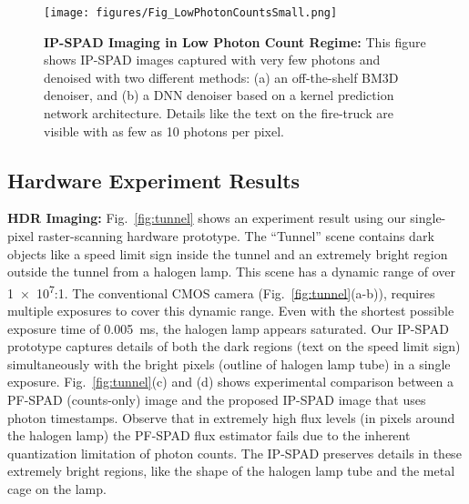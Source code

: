 
\begin{figure}[!htb]
  \centering
  \texttt{[image: figures/Fig\_LowPhotonCountsSmall.png]}
	\caption{\textbf{IP-SPAD Imaging in Low Photon Count Regime:}
  This figure shows IP-SPAD images captured with very few photons and denoised
  with two different methods: (a) an off-the-shelf BM3D denoiser, and (b) a DNN
  denoiser based on a kernel prediction network architecture.
  Details like the text on the fire-truck are visible with as few as 10 photons per
  pixel.\label{fig:low_counts}}
  \vspace{-0.15in}
\end{figure}



\subsection{Hardware Experiment Results}
\noindent\textbf{HDR Imaging:}
Fig.~\ref{fig:tunnel} shows an experiment result using our single-pixel
raster-scanning hardware prototype. The ``Tunnel'' scene contains dark objects
like a speed limit sign inside the tunnel and an extremely bright region
outside the tunnel from a halogen lamp.  This scene has a dynamic range of over
\num[retain-unity-mantissa=false]{1e7}:\num{1}. The conventional CMOS camera
(Fig.~\ref{fig:tunnel}(a-b)), requires multiple exposures to cover this dynamic
range.  Even with the shortest possible exposure time of \SI{0.005}{\ms}, the
halogen lamp appears saturated. Our IP-SPAD prototype captures details of both
the dark regions (text on the speed limit sign) simultaneously with the bright
pixels (outline of halogen lamp tube) in a single exposure.
Fig.~\ref{fig:tunnel}(c) and (d) shows experimental comparison between a
PF-SPAD (counts-only) image \cite{ingle2019high} and the proposed IP-SPAD image
that uses photon timestamps. Observe that in extremely high flux levels (in
pixels around the halogen lamp) the PF-SPAD flux estimator fails due to the
inherent quantization limitation of photon counts. The IP-SPAD preserves 
details in these extremely bright regions, like the shape of the halogen 
lamp tube and the metal cage on the lamp.

